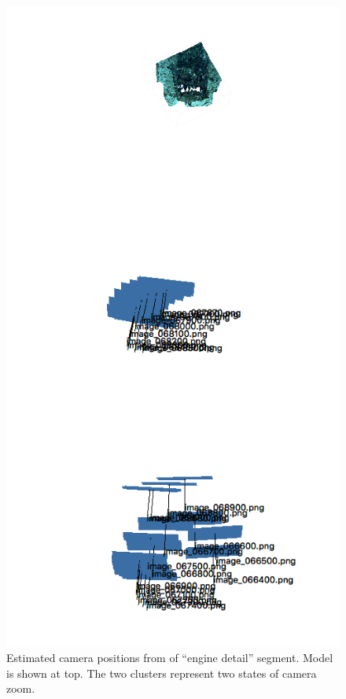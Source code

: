 \documentclass[letterpaper,12pt]{article}
\begin{document}
\begin{figure}
    \centering
    \includegraphics[height=0.9\textheight]{images/engine_detail_photoscan_trajectory.png}
    \caption{Estimated camera positions from of ``engine detail'' segment.  Model is shown at top.  The two clusters represent two states of camera zoom.}
    \label{fig:ex1605l3_dive22_engine_detail_photoscan_trajectory}
\end{figure}
\end{document}
